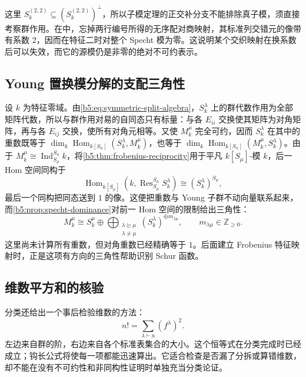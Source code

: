 这里 \(S_k^{(2,2)}\subseteq(S_k^{(2,2)})^\perp\)，所以子模定理的正交补分支不能排除真子模，须直接考察群作用。在中，忘掉两行编号所得的无序配对商映射，其标准列交错元的像带有系数 \(2\)，因而在特征二时对整个 Specht 模为零。这说明某个交织映射在换系数后可以失效，而它的源模仍是非零的绝对不可约表示。

\subsection{Young 置换模分解的支配三角性}
\label{b5:subsec:0604:06}

设 \(k\) 为特征零域。由\eqref{b5:eq:symmetric-split-algebra}，\(S_k^\lambda\) 上的群代数作用为全部矩阵代数，所以与群作用对易的自同态只有标量：与各 \(E_{ii}\) 交换使其矩阵为对角矩阵，再与各 \(E_{ij}\) 交换，使所有对角元相等。又使 \(M_k^\mu\) 完全可约，因而 \(S_k^\lambda\) 在其中的重数既等于 \(\dim_k\operatorname{Hom}_{k[S_n]}(S_k^\lambda,M_k^\mu)\)，也等于 \(\dim_k\operatorname{Hom}_{k[S_n]}(M_k^\mu,S_k^\lambda)\)。由于 \(M_k^\mu\cong\operatorname{Ind}_{S_\mu}^{S_n}k\)，将\cref{b5:thm:frobenius-reciprocity}用于平凡 \(k[S_\mu]\)-模 \(k\)，后一 Hom 空间同构于
\[
	\operatorname{Hom}_{k[S_\mu]}(k,\operatorname{Res}_{S_\mu}^{S_n}S_k^\lambda) \cong (S_k^\lambda)^{S_\mu},
\]
最后一个同构把同态送到 \(1\) 的像。这便把重数与 Young 子群不动向量联系起来，而\cref{b5:prop:specht-dominance}对前一 Hom 空间的限制给出三角性：
\[
	M_k^\mu\cong S_k^\mu\oplus \bigoplus_{\substack{\lambda\trianglerighteq\mu\\\lambda\ne\mu}} (S_k^\lambda)^{\oplus m_{\lambda\mu}}, \qquad m_{\lambda\mu}\in\mathbb Z_{\geq0}.
\]
这里尚未计算所有重数，但对角重数已经精确等于 \(1\)。后面建立 Frobenius 特征映射时，正是这项有方向的三角性帮助识别 Schur 函数。

\subsection{维数平方和的核验}
\label{b5:subsec:0604:07}

分类还给出一个事后检验维数的方法：
\[
	n!=\sum_{\lambda\vdash n}(f^\lambda)^2.
\]
左边来自群的阶，右边来自各个标准表集合的大小。这个恒等式在分类完成时已经成立；钩长公式将使每一项都能迅速算出。它适合检查是否漏了分拆或算错维数，却不能在没有不可约性和非同构性证明时单独充当分类论证。
